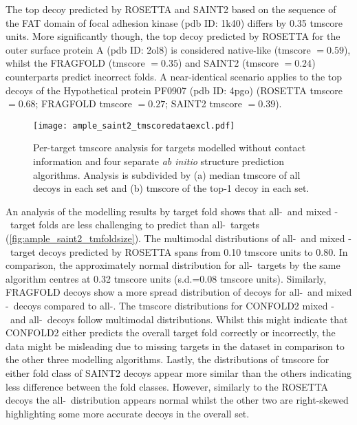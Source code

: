 The top decoy predicted by ROSETTA and SAINT2 based on the sequence of the FAT domain of focal adhesion kinase (\gls{pdb} ID: 1k40) differs by 0.35 \gls{tmscore} units. More significantly though, the top decoy predicted by ROSETTA for the outer surface protein A (\gls{pdb} ID: 2ol8) is considered native-like (\gls{tmscore} $=0.59$), whilst the FRAGFOLD (\gls{tmscore} $=0.35$) and SAINT2 (\gls{tmscore} $=0.24$) counterparts predict incorrect folds. A near-identical scenario applies to the top decoys of the Hypothetical protein PF0907 (\gls{pdb} ID: 4pgo) (ROSETTA \gls{tmscore} $=0.68$; FRAGFOLD \gls{tmscore} $=0.27$; SAINT2 \gls{tmscore} $=0.39$).

\begin{figure}[H]
    \centering
    \texttt{[image: ample\_saint2\_tmscoredataexcl.pdf]}
    \caption[Per-target TM-score analysis for four modelling algorithms without contacts]{Per-target \gls{tmscore} analysis for targets modelled without contact information and four separate \textit{ab initio} structure prediction algorithms. Analysis is subdivided by (a) median \gls{tmscore} of all decoys in each set and (b) \gls{tmscore} of the top-1 decoy in each set.}
    \label{fig:ample_saint2_tmscoredataexcl}
\end{figure}

An analysis of the modelling results by target fold shows that all-\textalpha\ and mixed \textalpha-\textbeta\ target folds are less challenging to predict than all-\textbeta\ targets (\cref{fig:ample_saint2_tmfoldsize}). The multimodal distributions of all-\textalpha\ and mixed \textalpha-\textbeta\ target decoys predicted by ROSETTA spans from 0.10 \gls{tmscore} units to 0.80. In comparison, the approximately normal distribution for all-\textbeta\ targets by the same algorithm centres at 0.32 \gls{tmscore} units (s.d.=0.08 \gls{tmscore} units). Similarly, FRAGFOLD decoys show a more spread distribution of decoys for all-\textalpha\ and mixed \textalpha-\textbeta\ decoys compared to all-\textbeta. The \gls{tmscore} distributions for CONFOLD2 mixed \textalpha-\textbeta\ and all-\textbeta\ decoys follow multimodal distributions. Whilst this might indicate that CONFOLD2 either predicts the overall target fold correctly or incorrectly, the data might be misleading due to missing targets in the dataset in comparison to the other three modelling algorithms. Lastly, the distributions of \gls{tmscore} for either fold class of SAINT2 decoys appear more similar than the others indicating less difference between the fold classes. However, similarly to the ROSETTA decoys the all-\textbeta\ distribution appears normal whilst the other two are right-skewed highlighting some more accurate decoys in the overall set.

